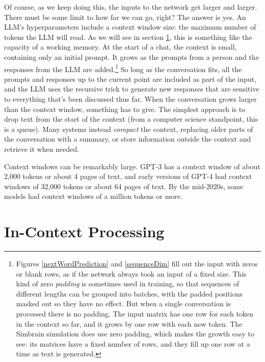 Of course, as we keep doing this, the inputs to the network get larger and
larger. There must be some limit to how far we can go, right? The answer is
yes. An LLM's hyperparameters include a context window size: the
maximum number of tokens the LLM will read. As we will see in section
\ref{inContext}, this is something like the capacity of a working memory. At the start of a
chat, the context is small, containing only an initial prompt. It grows as the
prompts from a person and the responses from the LLM are added.\footnote{Figures
\ref{nextWordPrediction} and \ref{sequenceDim} fill out the input with zeros
or blank rows, as if the network always took an input of a fixed size. This
kind of zero \emph{padding} is sometimes used in training, so that sequences of
different lengths can be grouped into batches, with the padded positions masked
out so they have no effect. But when a single conversation is processed there is no padding.
The input matrix has one row for each token in the context so far, and it grows
by one row with each new token. The Simbrain simulation
 does use zero padding, which makes
the growth easy to see: its matrices have a fixed number of rows, and they fill
up one row at a time as text is generated.} So long as the conversation fits, all the
prompts and responses up to the current point are included as part of the
input, and the LLM uses the recursive trick to generate new responses that are
sensitive to everything that's been discussed thus far. When the conversation
grows larger than the context window, something has to give. The simplest
approach is to drop text from the start of the context (from a computer science
standpoint, this is a queue). Many systems instead
\emph{compact} the context, replacing older parts of the conversation with a
summary, or store information outside the context and retrieve it when
needed.

Context windows can be remarkably large. GPT-3 has a context window of about 2,000 tokens or about 4 pages of text, and early versions of GPT-4 had context windows of 32,000 tokens or about 64 pages of text. By the mid-2020s, some models had context windows of a million tokens or more.

\section{In-Context Processing}\label{inContext}


